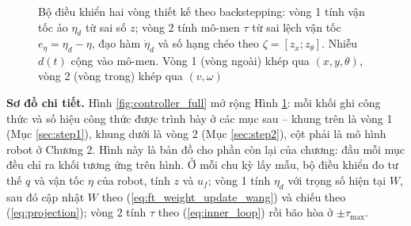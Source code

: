 \documentclass[12pt,a4paper]{article}
\begin{document}
\begin{figure}[H]
{%
}
\caption{Bộ điều khiển hai vòng thiết kế theo backstepping: vòng 1 tính vận tốc ảo $\eta_d$ từ sai số $z$; vòng 2 tính mô-men $\tau$ từ sai lệch vận tốc $e_\eta = \eta_d - \eta$, đạo hàm $\dot\eta_d$ và số hạng chéo theo $\zeta = [z_x; z_\theta]$. Nhiễu $d(t)$ cộng vào mô-men. Vòng 1 (vòng ngoài) khép qua $(x, y, \theta)$, vòng 2 (vòng trong) khép qua $(v, \omega)$}
\label{fig:architecture}
\end{figure}

\textbf{Sơ đồ chi tiết.} Hình \ref{fig:controller_full} mở rộng Hình \ref{fig:architecture}: mỗi khối ghi công thức và số hiệu công thức được trình bày ở các mục sau -- khung trên là vòng 1 (Mục \ref{sec:step1}), khung dưới là vòng 2 (Mục \ref{sec:step2}), cột phải là mô hình robot ở Chương 2. Hình này là bản đồ cho phần còn lại của chương: đầu mỗi mục đều chỉ ra khối tương ứng trên hình. Ở mỗi chu kỳ lấy mẫu, bộ điều khiển đo tư thế $q$ và vận tốc $\eta$ của robot, tính $z$ và $u_f$; vòng 1 tính $\eta_d$ với trọng số hiện tại $W$, sau đó cập nhật $W$ theo (\ref{eq:ft_weight_update_wang}) và chiếu theo (\ref{eq:projection}); vòng 2 tính $\tau$ theo (\ref{eq:inner_loop}) rồi bão hòa ở $\pm\tau_{\max}$.
\end{document}
